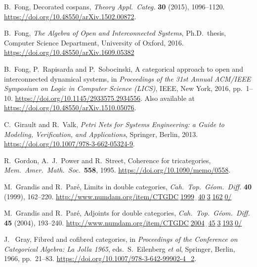 \documentclass[a4paper,onecolumn, superscriptaddress,10pt, accepted=2022-03-25, issue=SS, volume=VV, shorttitle=papers/compositionality-VV-SS]{compositionalityarticle}
\begin{document}
\begin{thebibliography}{100}
 B.\ Fong, Decorated cospans, \emph{Theory Appl.\ Categ.} \textbf{30} (2015), 1096--1120.  \hfill \break 
\href{https://doi.org/10.48550/arXiv.1502.00872}{https://doi.org/10.48550/arXiv.1502.00872}.

 B.\ Fong, \textsl{The Algebra of Open and Interconnected Systems},
Ph.D.\ thesis, Computer Science Department, University of Oxford, 2016.  \href{https://doi.org/10.48550/arXiv.1609.05382}{https://doi.org/10.48550/arXiv.1609.05382}

 B.\ Fong, P.\ Rapisarda and P.\ Sobocinski, A categorical approach to open and interconnected dynamical systems, in \textsl{Proceedings 
of the 31st Annual ACM/IEEE Symposium on Logic in Computer Science (LICS)}, IEEE, New York, 2016, pp.\ 1--10. 
\href{https://doi.org/10.1145/2933575.2934556}{https://doi.org/10.1145/2933575.2934556}. Also available at
\href{https://doi.org/10.48550/arXiv.1510.05076}{https://doi.org/10.48550/arXiv.1510.05076}.

 C.\ Girault and R.\ Valk, \textsl{Petri Nets for Systems Engineering: a Guide to Modeling, Verification, and Applications}, 
Springer, Berlin, 2013. \href{https://doi.org/10.1007/978-3-662-05324-9}{https://doi.org/10.1007/978-3-662-05324-9}.

 R.\ Gordon, A.\ J.\ Power and R.\ Street, Coherence for tricategories, \textsl{Mem.\ Amer.\ Math.\ Soc.\ }\textbf{558}, 1995. 
\href{https://doi.org/10.1090/memo/0558}{https://doi.org/10.1090/memo/0558}.

 M.\ Grandis and R.\ Par\'e, Limits in double categories, \textsl{Cah.\ Top.\ G\'eom.\ Diff.} \textbf{40} (1999), 162--220. \href{http://www.numdam.org/item/CTGDC_1999__40_3_162_0/}{http://www.numdam.org/item/CTGDC$\underline{\;}$1999$\underline{\;\;}$40$\underline{\;}$3$\underline{\;}$162$\underline{\;}$0/}

 M.\ Grandis and R.\ Par\'e, Adjoints for double categories, 
 \textsl{Cah.\ Top.\ G\'eom.\ Diff.} \textbf{45} (2004), 193--240.
 \href{http://www.numdam.org/item/CTGDC_2004__45_3_193_0/}{http://www.numdam.org/item/CTGDC$\underline{\;}$2004$\underline{\;\;}$45$\underline{\;}$3$\underline{\;}$193$\underline{\;}$0/}

 J. \ Gray, Fibred and cofibred categories, in \textsl{Proceedings of the Conference on Categorical Algebra: La Jolla 1965}, eds.\ S.\ 
Eilenberg \textit{et al}, Springer, Berlin, 1966, pp.\ 21--83. 
\href{https://doi.org/10.1007/978-3-642-99902-4\_2}{https://doi.org/10.1007/978-3-642-99902-4\_2}.


\end{thebibliography}
\end{document}
